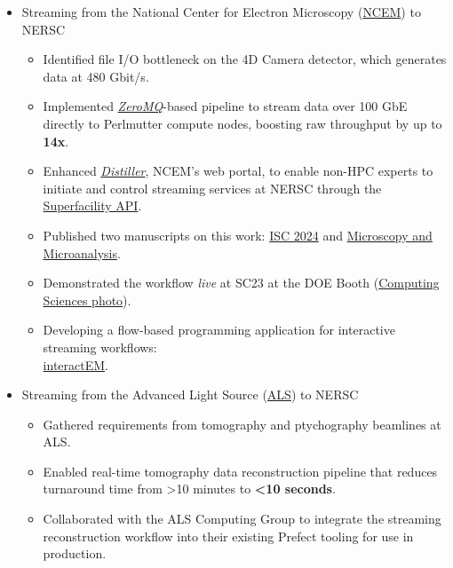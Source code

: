 \documentclass[11pt]{article} %
\begin{document}
\begin{itemize}
  \item Streaming from the National Center for Electron Microscopy (\href{https://foundry.lbl.gov/about/facilities/the-national-center-for-electron-microscopy-ncem/}{NCEM}) to NERSC
    \begin{itemize}
      \item Identified file I/O bottleneck on the 4D Camera detector, which generates data at 480 Gbit/s.
      \item Implemented \textit{\href{https://zeromq.org/}{ZeroMQ}}-based pipeline to stream data over 100 GbE directly to Perlmutter compute nodes, boosting raw throughput by up to \textbf{14x}.
      \item Enhanced \textit{\href{https://github.com/OpenChemistry/distiller}{Distiller}}, NCEM's web portal, to enable non-HPC experts to initiate and control streaming services at NERSC through the \href{https://docs.nersc.gov/services/sfapi/}{Superfacility API}.\
      \item Published two manuscripts on this work: \href{https://link.springer.com/chapter/10.1007/978-3-031-73716-9_17}{ISC 2024} and \href{https://doi.org/10.1093/mam/ozae109}{Microscopy and Microanalysis}.
      \item Demonstrated the workflow \textit{live} at SC23 at the DOE Booth (\href{https://github.com/user-attachments/assets/4e6b2dd4-da00-4472-a519-34f49085c1ea}{Computing Sciences photo}).
      \item Developing a flow-based programming application for interactive streaming workflows:\\\href{https://github.com/NERSC/interactEM}{interactEM}.
    \end{itemize}

  \item Streaming from the Advanced Light Source (\href{https://als.lbl.gov/}{ALS}) to NERSC
    \begin{itemize}
      \item Gathered requirements from tomography and ptychography beamlines at ALS.\
      \item Enabled real-time tomography data reconstruction pipeline that reduces turnaround time from \textgreater 10 minutes to \textbf{\textless 10 seconds}.
      \item Collaborated with the ALS Computing Group to integrate the streaming reconstruction workflow into their existing Prefect tooling for use in production.
    \end{itemize}
    \newpage


\end{itemize}
\end{document}

